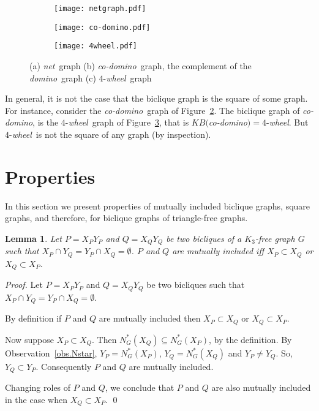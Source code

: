 \documentclass{article}
\newcommand{\margem}[2]
        {\mbox{}\marginpar{%
        \raggedright\textcolor{#2}{%
        \hspace{0pt}\bfseries\ssmall #1\\}}}
\newcommand{\comment}[3]{\margem{\textit{(#1)}\\ #3}{#2}}
\newcommand{\ag}[1]{\comment{AG}{blue}{#1}}
\newcommand{\net}{\emph{net}}
\newcommand{\codomino}{\emph{co-domino}}
\newcommand{\domino}{\emph{domino}}
\newcommand{\wheel}{\emph{wheel}}
\newtheorem{lemma}{Lemma}
\begin{document}
\begin{figure}[htb]
\centering
\begin{subfigure}{.33\textwidth}
  \centering
  \texttt{[image: netgraph.pdf]}
  \caption{}
  \label{fig:netgraph}
\end{subfigure}%
\begin{subfigure}{.33\textwidth}
  \centering
  \texttt{[image: co-domino.pdf]}
  \caption{}
  \label{fig:co-domino}
\end{subfigure}%
\begin{subfigure}{.33\textwidth}
  \centering
  \texttt{[image: 4wheel.pdf]}
  \caption{}
  \label{fig:4wheel}
\end{subfigure}
\caption{(a) \net\ graph (b) \codomino\ graph, the  complement of the
  \domino\ graph (c) $4$-\wheel\ graph}
\label{fig:test}
\end{figure}

In general, it is  not the case that the biclique graph  is the square of
some   graph.   For   instance,   consider  the   \codomino\  graph   of
Figure~\ref{fig:co-domino}.   The biclique  graph of  \codomino, is  the
$4$-\wheel\     graph     of    Figure~\ref{fig:4wheel},     that     is
$KB($\codomino$) = 4$-\wheel.  But $4$-\wheel\  is not the square of any
graph (by inspection).

\section{Properties}     %

In this section we present properties of mutually included biclique graphs, 
square graphs, and therefore,
for biclique graphs of triangle-free graphs. 

\begin{lemma}\label{lem.mutually-subset}
  Let $P  = X_PY_P$ and  $Q = X_QY_Q$ be  two bicliques of  a $K_3$-free
  graph $G$ such  that $X_P \cap Y_Q  = Y_P \cap X_Q  = \emptyset$.  $P$
  and $Q$  are mutually  included iff  $X_P \subset  X_Q$ or
  $X_Q \subset X_P$.
\end{lemma}
\begin{proof}
  Let  $P  =  X_PY_P$ and  $Q  =  X_QY_Q$  be  two bicliques  such  that
  $X_P \cap Y_Q = Y_P \cap X_Q = \emptyset$.

  By   definition  if   $P$   and  $Q$   are   mutually  included   then
  $X_P \subset X_Q$ or $X_Q \subset X_P$.

  Now        suppose        $X_P       \subset        X_Q$.         Then
  $N_G^*(X_Q)   \subseteq   N_G^*(X_P)$,    by   the   definition.    By
  Observation~\ref{obs.Nstar},  $Y_P =  N_G^*(X_P)$,  $Y_Q  = N_G^*(X_Q)$  and
  $Y_P \neq Y_Q$.   So, $Y_Q \subset Y_P$. Consequently $P$  and $Q$ are
  mutually included.

  Changing roles of $P$  and $Q$, we conclude that $P$  and $Q$ are also
  mutually included in the case when $X_Q \subset X_P$.
  \qed
\end{proof}
\end{document}
